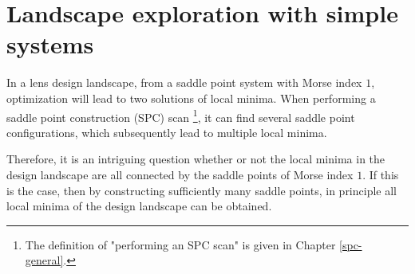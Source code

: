 \setlength{\parskip}{.2em}
\graphicspath{ {./chapter-3/figures/} }
\captionsetup[figure]{labelfont=bf}
\captionsetup{margin=1.5em}
\captionsetup[table]{labelfont=bf}


\chapter{Landscape exploration with simple systems}
\label{chapter_3}







\noindent 
In a lens design landscape, from a saddle point system with Morse index $1$, optimization will lead to two solutions of local minima.  When performing a saddle point construction (SPC) scan \footnote{The definition of "performing an SPC scan" is given in Chapter \ref{spc-general}.}, it can find several saddle point configurations, which subsequently lead to multiple local minima. 

Therefore, it is an intriguing question whether or not the local minima in the design landscape are all connected by the saddle points of Morse index $1$. If this is the case, then by constructing sufficiently many saddle points, in principle all local minima of the design landscape can be obtained. 

